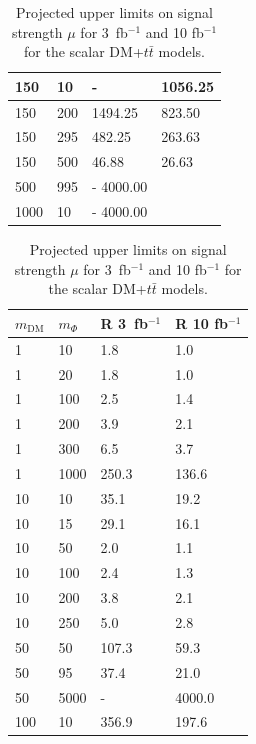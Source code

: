 \begin{table}
\begin{minipage}{.45\textwidth}
{\begin{tabular}{llll}
    150     & 10      & -       & 1056.25 \\ \hline
    150     & 200     & 1494.25 & 823.50 \\ \hline
    150     & 295     & 482.25  & 263.63 \\ \hline
    150     & 500     & 46.88   & 26.63 \\ \hline
    500     & 995     & -       4000.00 \\ \hline
    1000    & 10      & -       4000.00 \\ \hline
  \end{tabular}
  \caption{Projected  upper limits on signal strength $\mu$ for 3~fb$^{-1}$ and 10 fb$^{-1}$ for the scalar  DM+$t\bar{t}$ models. \label{tab:dmtt_S_R_values}}
}\end{minipage}%
\hfill
\begin{minipage}{.45\textwidth}{
  \begin{tabular}{llll}
    \hline                      
    $m_\textrm{DM}$ & $m_\Phi$  & R 3~fb$^{-1}$ & R 10 fb$^{-1}$ \\ \hline
    1       & 10      & 1.8     & 1.0 \\ \hline
    1       & 20      & 1.8     & 1.0 \\ \hline
    1       & 100     & 2.5     & 1.4 \\ \hline
    1       & 200     & 3.9     & 2.1 \\ \hline
    1       & 300     & 6.5     & 3.7 \\ \hline
    1       & 1000    & 250.3   & 136.6 \\ \hline
    10      & 10      & 35.1    & 19.2 \\ \hline
    10      & 15      & 29.1    & 16.1 \\ \hline
    10      & 50      & 2.0     & 1.1 \\ \hline
    10      & 100     & 2.4     & 1.3 \\ \hline
    10      & 200     & 3.8     & 2.1 \\ \hline
    10      & 250     & 5.0     & 2.8 \\ \hline
    50      & 50      & 107.3   & 59.3 \\ \hline
    50      & 95      & 37.4    & 21.0 \\ \hline
    50      & 5000    & -       & 4000.0 \\ \hline
    100     & 10      & 356.9   & 197.6 \\ \hline

\end{tabular}}
\end{minipage}
\end{table}
